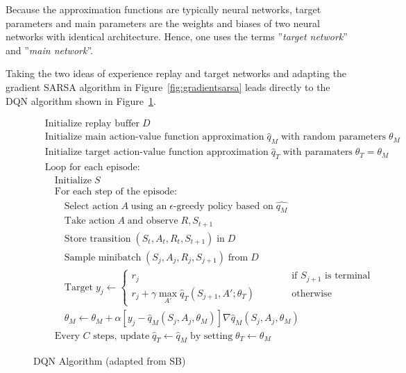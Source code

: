 Because the approximation functions are typically neural networks, target parameters and main parameters are the weights and biases of two neural networks with identical architecture. Hence, one uses the terms ''\emph{target network}'' and ''\emph{main network}''.

Taking the two ideas of experience replay and target networks and adapting the gradient SARSA algorithm in Figure~\ref{fig:gradientsarsa} leads directly to the DQN algorithm shown in Figure~\ref{fig:dqn}.

\begin{figure}
\small
\begin{pseudocodebox}
\vspace{-\baselineskip}
\begin{align*}
& \text{Initialize replay buffer}\;D \\
& \text{Initialize main action-value function approximation}\;\hat{q}_M\;\text{with random parameters}\;\theta_M \\
& \text{Initialize target action-value function approximation}\;\hat{q}_T\;\text{with paramaters}\;\theta_T=\theta_M \\
& \text{Loop for each episode:}\\
& \quad \text{Initialize}\;S \\
& \quad \text{For each step of the episode:} \\
& \quad \quad \text{Select action}\; A \; \text{using an} \; \text{$\epsilon$-greedy policy based on}\; \hat{q_M}\\
& \quad \quad \text{Take action} \; A \; \text{and observe}\;R, S_{t+1} \\
& \quad \quad \text{Store transition} \; (S_t , A_t , R_t , S_{t+1} ) \; \text{in} \; D \\
& \quad \quad \text{Sample minibatch} \; (S_j , A_j , R_j , S_{j+1} ) \; \text{from} \; D \\
& \quad \quad \text{Target}\;y_j \leftarrow \begin{cases} r_j & \qquad \quad \text{if $S_{j+1}$ is terminal} \\
r_j + \gamma \operatorname*{max}_{A'} \hat{q}_T(S_{j+1}, A'; \theta_T) & \qquad \quad \text{otherwise}\end{cases} \\
& \quad \quad \theta_M \leftarrow \theta_M + \alpha [y_j - \hat{q}_M (S_j, A_j, \theta_M)] \nabla \hat{q}_M(S_j, A_j, \theta_M) \hspace{1in} \\
& \quad \text{Every $C$ steps, update}\; \hat{q}_T \leftarrow \hat{q}_M\;\text{by setting}\; \theta_T \leftarrow \theta_M
\end{align*}
\end{pseudocodebox}
\caption{DQN Algorithm (adapted from SB)}
\label{fig:dqn}
\end{figure}

